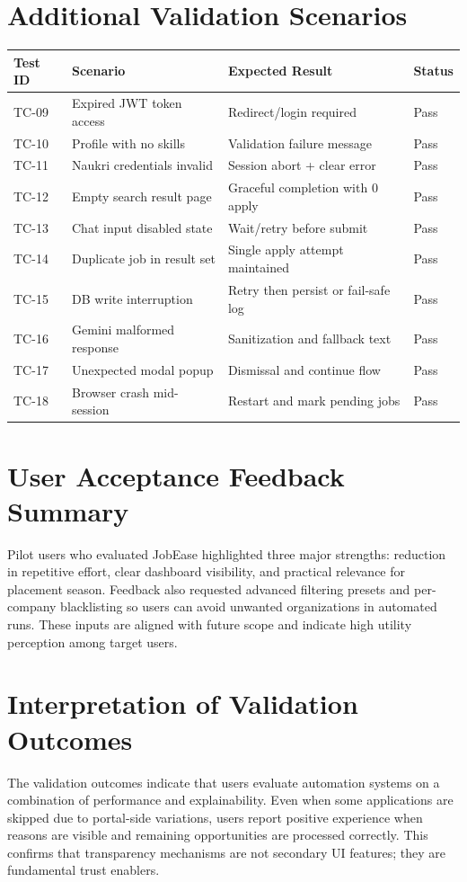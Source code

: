 \documentclass[12pt,a4paper,oneside]{report}
\begin{document}
\section{Additional Validation Scenarios}
\begin{longtable}{p{}p{}p{}p{}}
\toprule
Test ID & Scenario & Expected Result & Status \\
\midrule
TC-09 & Expired JWT token access & Redirect/login required & Pass \\
TC-10 & Profile with no skills & Validation failure message & Pass \\
TC-11 & Naukri credentials invalid & Session abort + clear error & Pass \\
TC-12 & Empty search result page & Graceful completion with 0 apply & Pass \\
TC-13 & Chat input disabled state & Wait/retry before submit & Pass \\
TC-14 & Duplicate job in result set & Single apply attempt maintained & Pass \\
TC-15 & DB write interruption & Retry then persist or fail-safe log & Pass \\
TC-16 & Gemini malformed response & Sanitization and fallback text & Pass \\
TC-17 & Unexpected modal popup & Dismissal and continue flow & Pass \\
TC-18 & Browser crash mid-session & Restart and mark pending jobs & Pass \\
\bottomrule
\end{longtable}

\section{User Acceptance Feedback Summary}
Pilot users who evaluated JobEase highlighted three major strengths: reduction in repetitive effort, clear dashboard visibility, and practical relevance for placement season. Feedback also requested advanced filtering presets and per-company blacklisting so users can avoid unwanted organizations in automated runs. These inputs are aligned with future scope and indicate high utility perception among target users.

\section{Interpretation of Validation Outcomes}
The validation outcomes indicate that users evaluate automation systems on a combination of performance and explainability. Even when some applications are skipped due to portal-side variations, users report positive experience when reasons are visible and remaining opportunities are processed correctly. This confirms that transparency mechanisms are not secondary UI features; they are fundamental trust enablers.
\end{document}
